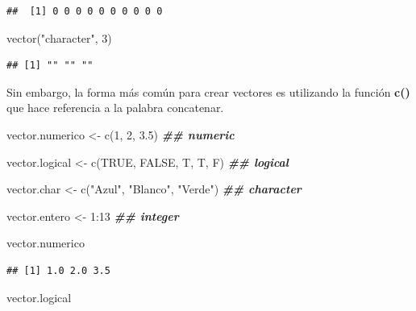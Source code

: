 \documentclass[
  12pt,
]{book}
\newenvironment{Shaded}{\begin{snugshade}}{\end{snugshade}}
\newcommand{\ConstantTok}[1]{\textcolor[rgb]{0.00,0.00,0.00}{#1}}
\newcommand{\DecValTok}[1]{\textcolor[rgb]{0.00,0.00,0.81}{#1}}
\newcommand{\DocumentationTok}[1]{\textcolor[rgb]{0.56,0.35,0.01}{\textbf{\textit{#1}}}}
\newcommand{\FloatTok}[1]{\textcolor[rgb]{0.00,0.00,0.81}{#1}}
\newcommand{\FunctionTok}[1]{\textcolor[rgb]{0.00,0.00,0.00}{#1}}
\newcommand{\NormalTok}[1]{#1}
\newcommand{\OtherTok}[1]{\textcolor[rgb]{0.56,0.35,0.01}{#1}}
\newcommand{\SpecialCharTok}[1]{\textcolor[rgb]{0.00,0.00,0.00}{#1}}
\newcommand{\StringTok}[1]{\textcolor[rgb]{0.31,0.60,0.02}{#1}}
\begin{document}
\begin{verbatim}
##  [1] 0 0 0 0 0 0 0 0 0 0
\end{verbatim}

\begin{Shaded}
\begin{Highlighting}[]
\FunctionTok{vector}\NormalTok{(}\StringTok{"character"}\NormalTok{, }\DecValTok{3}\NormalTok{)}
\end{Highlighting}
\end{Shaded}

\begin{verbatim}
## [1] "" "" ""
\end{verbatim}

Sin embargo, la forma más común para crear vectores es utilizando la función \textbf{c()} que hace referencia a la palabra concatenar.

\begin{Shaded}
\begin{Highlighting}[]
\NormalTok{vector.numerico }\OtherTok{\textless{}{-}} \FunctionTok{c}\NormalTok{(}\DecValTok{1}\NormalTok{, }\DecValTok{2}\NormalTok{, }\FloatTok{3.5}\NormalTok{)   }\DocumentationTok{\#\# numeric}

\NormalTok{vector.logical }\OtherTok{\textless{}{-}} \FunctionTok{c}\NormalTok{(}\ConstantTok{TRUE}\NormalTok{, }\ConstantTok{FALSE}\NormalTok{, T, T, F) }\DocumentationTok{\#\# logical}

\NormalTok{vector.char }\OtherTok{\textless{}{-}} \FunctionTok{c}\NormalTok{(}\StringTok{"Azul"}\NormalTok{, }\StringTok{"Blanco"}\NormalTok{, }\StringTok{"Verde"}\NormalTok{) }\DocumentationTok{\#\# character}

\NormalTok{vector.entero }\OtherTok{\textless{}{-}} \DecValTok{1}\SpecialCharTok{:}\DecValTok{13}   \DocumentationTok{\#\# integer}
\end{Highlighting}
\end{Shaded}

\begin{Shaded}
\begin{Highlighting}[]
\NormalTok{vector.numerico}
\end{Highlighting}
\end{Shaded}

\begin{verbatim}
## [1] 1.0 2.0 3.5
\end{verbatim}

\begin{Shaded}
\begin{Highlighting}[]
\NormalTok{vector.logical}
\end{Highlighting}
\end{Shaded}
\end{document}
